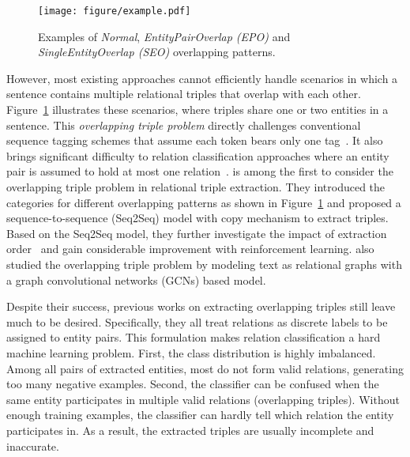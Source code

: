 \documentclass[11pt,a4paper]{article}
\begin{document}
\begin{figure} [!t]
	\centering
	\texttt{[image: figure/example.pdf]}
	\caption{Examples of \emph{Normal}, \emph{EntityPairOverlap (EPO)} and \emph{SingleEntityOverlap (SEO)} overlapping patterns.}
	\label{fig:categories}
\end{figure}


\par However, most existing approaches cannot efficiently handle scenarios in which a sentence contains multiple relational triples that overlap with each other. Figure~\ref{fig:categories} illustrates these scenarios, where triples share one or two entities in a sentence. This \emph{overlapping triple problem} directly challenges conventional sequence tagging schemes that assume each token bears only one tag~\citep{zheng2017Joint}. It also brings significant difficulty to relation classification approaches where an entity pair is assumed to hold at most one relation~\citep{miwa2016End}. \citet{zeng2018Extracting} is among the first to consider the overlapping triple problem in relational triple extraction. They introduced the categories for different overlapping patterns as shown in Figure~\ref{fig:categories} and proposed a sequence-to-sequence (Seq2Seq) model with copy mechanism to extract triples. Based on the Seq2Seq model, they further investigate the impact of extraction order~\cite{zeng2019Learning} and gain considerable improvement with reinforcement learning. \citet{fu2019GraphRel} also studied the overlapping triple problem by modeling text as relational graphs with a graph convolutional networks (GCNs) based model.

\par Despite their success, previous works on extracting overlapping triples still leave much to be desired. Specifically, they all treat relations as discrete labels to be assigned to entity pairs. This formulation makes relation classification a hard machine learning problem. First, the class distribution is highly imbalanced. Among all pairs of extracted entities, most do not form valid relations, generating too many negative examples. Second, the classifier can be confused when the same entity participates in multiple valid relations (overlapping triples). Without enough training examples, the classifier can hardly tell which relation the entity participates in. As a result, the extracted triples are usually incomplete and inaccurate.
\end{document}
